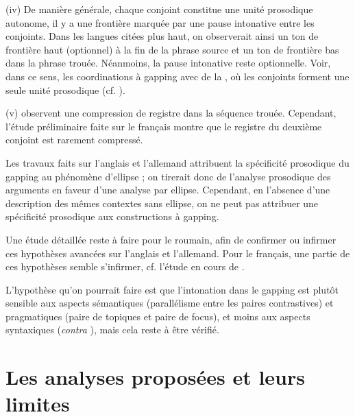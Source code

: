 (iv) De manière générale, chaque conjoint constitue une unité prosodique autonome, {\cad} il y a une frontière marquée par une pause intonative entre les conjoints. Dans les langues citées plus haut, on observerait ainsi un ton de frontière haut (optionnel) à la fin de la phrase source et un ton de frontière bas dans la phrase trouée. Néanmoins, la pause intonative reste optionnelle. Voir, dans ce sens, les coordinations à gapping avec  de la , où les conjoints forment une seule unité prosodique (cf. \citealt{Oehrle1987,Winkler2005}).

(v) \citet{FeryEtAl2005} observent une compression de registre dans la séquence trouée. Cependant, l’étude préliminaire faite sur le français montre que le registre du deuxième conjoint est rarement compressé. 

Les travaux faits sur l’anglais et l’allemand attribuent la spécificité prosodique du gapping au phénomène d’ellipse ; on tirerait donc de l’analyse prosodique des arguments en faveur d’une analyse par ellipse. Cependant, en l’absence d’une description des mêmes contextes sans ellipse, on ne peut pas attribuer une spécificité prosodique aux constructions à gapping.

Une étude détaillée reste à faire pour le roumain, afin de confirmer ou infirmer ces hypothèses avancées sur l’anglais et l’allemand. Pour le français, une partie de ces hypothèses semble s’infirmer, cf. l’étude en cours de \citet{AbeilleEtAlInPrep}.

L’hypothèse qu’on pourrait faire est que l’intonation dans le gapping est plutôt sensible aux aspects sémantiques (parallélisme entre les paires contrastives) et pragmatiques (paire de topiques et paire de focus), et moins aux aspects syntaxiques (\textit{contra} \citealt{FeryEtAl2005}), mais cela reste à être vérifié.


\section{Les analyses proposées et leurs limites} \label{ch2:sect2.4}


